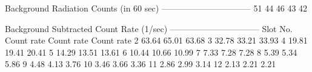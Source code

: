 Background Radiation Counts (in 60 sec)
--------------------------------
51
44
46
43
42

Background Subtracted Count Rate (1/sec)
--------------------------------
Slot No.	Count rate	Count rate	Count rate
2		63.64		65.01		63.68
3		32.78		33.21		33.93
4		19.81		19.41		20.41
5		14.29		13.51		13.61
6		10.44		10.66		10.99
7		7.33		7.28		7.28
8		5.39		5.34		5.86
9		4.48		4.13		3.76
10		3.46		3.66		3.36
11		2.86		2.99		3.14
12		2.13		2.21		2.21
